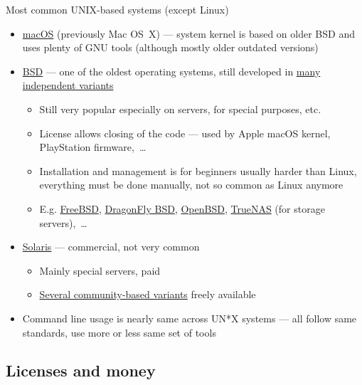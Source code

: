 \documentclass[compress, ucs, xelatex, 11pt, xcolor=svgnames, aspectratio=169,
	hyperref={
		bookmarks=true,
		unicode=true,
		colorlinks=true,
		pdftitle={Linux, command line and MetaCentrum},
		plainpages=false,
		pdfauthor={Vojtech Zeisek},
		pdfsubject={Course about use of Linux command line, writing shell scripts and using MetaCentrum of CESNET},
		pdfcreator={XeLaTeX},
		pdfkeywords={Linux, GNU, BASH, shell, command line, MetaCentrum},
		linkcolor=DarkRed, %
		anchorcolor=DarkBlue, %
		citecolor=Indigo, %
		filecolor=NavyBlue, %
		menucolor=DarkMagenta, %
		urlcolor=DarkBlue, %
		pdftex},
	url={hyphens, lowtilde} %
	]{beamer}
\begin{document}
\begin{frame}{Most common UNIX-based systems (except Linux)}
	\begin{itemize}
		\item \href{https://en.wikipedia.org/wiki/macOS}{macOS} (previously Mac OS~X) --- system kernel is based on older BSD and uses plenty of GNU tools (although mostly older outdated versions)
		\item \href{https://en.wikipedia.org/wiki/Berkeley_Software_Distribution}{BSD} --- one of the oldest operating systems, still developed in \href{https://distrowatch.com/search.php?ostype=BSD}{many independent variants}
		\begin{itemize}
			\item Still very popular especially on servers, for special purposes, etc.
			\item License allows closing of the code --- used by Apple macOS kernel, PlayStation firmware,~\ldots
			\item Installation and management is for beginners usually harder than Linux, everything must be done manually, not so common as Linux anymore
			\item E.g. \href{https://www.freebsd.org/}{FreeBSD}, \href{https://www.dragonflybsd.org/}{DragonFly BSD}, \href{https://www.openbsd.org/}{OpenBSD}, \href{https://www.truenas.com/}{TrueNAS} (for storage servers),~\ldots
		\end{itemize}
		\item \href{https://en.wikipedia.org/wiki/Solaris_(operating_system)}{Solaris} --- commercial, not very common
		\begin{itemize}
			\item Mainly special servers, paid
			\item \href{https://distrowatch.com/search.php?ostype=Solaris}{Several community-based variants} freely available
		\end{itemize}
		\item Command line usage is nearly same across UN*X systems --- all follow same standards, use more or less same set of tools
	\end{itemize}
\end{frame}

\subsection{Licenses and money}
\end{document}
